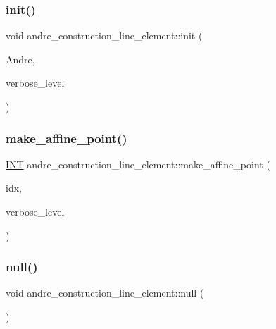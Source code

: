 \subsubsection{\texorpdfstring{init()}{init()}}
{\footnotesize\ttfamily void andre\+\_\+construction\+\_\+line\+\_\+element\+::init (\begin{DoxyParamCaption}\item[{\mbox{\hyperlink{classandre__construction}{andre\+\_\+construction}} $\ast$}]{Andre,  }\item[{\mbox{\hyperlink{galois_8h_a09fddde158a3a20bd2dcadb609de11dc}{I\+NT}}}]{verbose\+\_\+level }\end{DoxyParamCaption})}

\mbox{\label{classandre__construction__line__element_a55781e1e657966b9cda34742c5143345}} 
\subsubsection{\texorpdfstring{make\+\_\+affine\+\_\+point()}{make\_affine\_point()}}
{\footnotesize\ttfamily \mbox{\hyperlink{galois_8h_a09fddde158a3a20bd2dcadb609de11dc}{I\+NT}} andre\+\_\+construction\+\_\+line\+\_\+element\+::make\+\_\+affine\+\_\+point (\begin{DoxyParamCaption}\item[{\mbox{\hyperlink{galois_8h_a09fddde158a3a20bd2dcadb609de11dc}{I\+NT}}}]{idx,  }\item[{\mbox{\hyperlink{galois_8h_a09fddde158a3a20bd2dcadb609de11dc}{I\+NT}}}]{verbose\+\_\+level }\end{DoxyParamCaption})}

\mbox{\label{classandre__construction__line__element_a146b0e1fc8f112c5bff5db0f35bc39f1}} 
\subsubsection{\texorpdfstring{null()}{null()}}
{\footnotesize\ttfamily void andre\+\_\+construction\+\_\+line\+\_\+element\+::null (\begin{DoxyParamCaption}{ }\end{DoxyParamCaption})}

